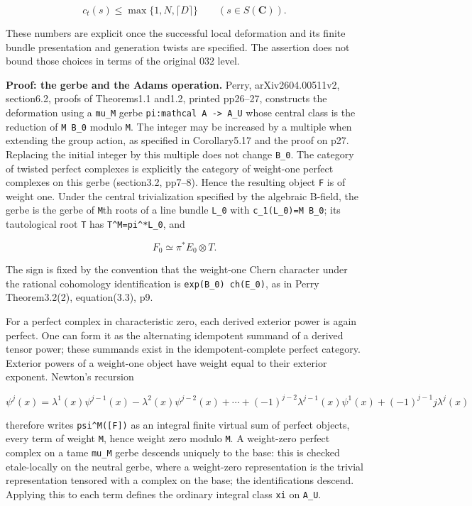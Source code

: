 \documentclass[11pt,a4paper]{article}
\theoremstyle{definition}
\begin{document}
\[
 c_t(s)\le \max\{1,N,\lceil D\rceil\}\qquad(s\in S(\mathbf C)).
\tag{DER4e}
\]

These numbers are explicit once the successful local deformation and its
finite bundle presentation and generation twists are specified. The
assertion does not bound those choices in terms of the original 032
level.

\textbf{Proof: the gerbe and the Adams operation.} Perry,
arXiv2604.00511v2, section6.2, proofs of Theorems1.1 and1.2, printed
pp26--27, constructs the deformation using a \texttt{mu\_M} gerbe
\texttt{pi:mathcal\ A\ -\textgreater{}\ A\_U} whose central class is the
reduction of \texttt{M\ B\_0} modulo \texttt{M}. The integer may be
increased by a multiple when extending the group action, as specified in
Corollary5.17 and the proof on p27. Replacing the initial integer by
this multiple does not change \texttt{B\_0}. The category of twisted
perfect complexes is explicitly the category of weight-one perfect
complexes on this gerbe (section3.2, pp7--8). Hence the resulting object
\texttt{F} is of weight one. Under the central trivialization specified
by the algebraic B-field, the gerbe is the gerbe of \texttt{M}th roots
of a line bundle \texttt{L\_0} with \texttt{c\_1(L\_0)=M\ B\_0}; its
tautological root \texttt{T} has \texttt{T\^{}M=pi\^{}*L\_0}, and

\[
 F_0\simeq \pi^*E_0\otimes T.
\]

The sign is fixed by the convention that the weight-one Chern character
under the rational cohomology identification is
\texttt{exp(B\_0)\ ch(E\_0)}, as in Perry Theorem3.2(2), equation(3.3),
p9.

For a perfect complex in characteristic zero, each derived exterior
power is again perfect. One can form it as the alternating idempotent
summand of a derived tensor power; these summands exist in the
idempotent-complete perfect category. Exterior powers of a weight-one
object have weight equal to their exterior exponent. Newton's recursion

\[
 \psi^j(x)=\lambda^1(x)\psi^{j-1}(x)
 -\lambda^2(x)\psi^{j-2}(x)+\cdots
 +(-1)^{j-2}\lambda^{j-1}(x)\psi^1(x)
 +(-1)^{j-1}j\lambda^j(x)
\tag{DER4f}
\]

therefore writes \texttt{psi\^{}M({[}F{]})} as an integral finite
virtual sum of perfect objects, every term of weight \texttt{M}, hence
weight zero modulo \texttt{M}. A weight-zero perfect complex on a tame
\texttt{mu\_M} gerbe descends uniquely to the base: this is checked
etale-locally on the neutral gerbe, where a weight-zero representation
is the trivial representation tensored with a complex on the base; the
identifications descend. Applying this to each term defines the ordinary
integral class \texttt{xi} on \texttt{A\_U}.
\end{document}
